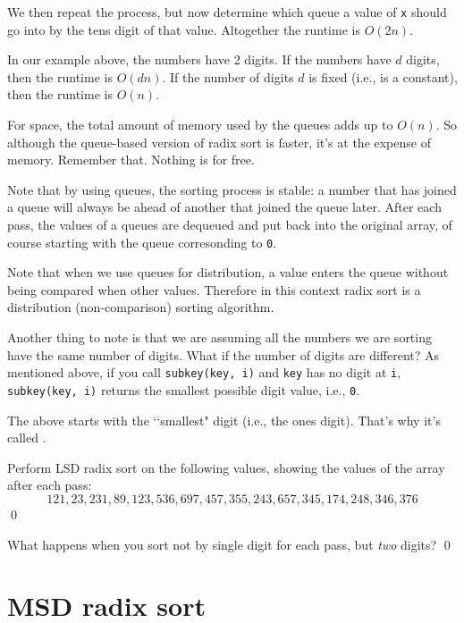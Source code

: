 We then repeat the process, but now determine which queue a value of \verb!x!
should go into by the tens digit of that value.
Altogether the runtime is $O(2n)$.

In our example above, the numbers have 2 digits.
If the numbers have $d$ digits, then the runtime is $O(dn)$.
If the number of digits $d$ is fixed (i.e., is a constant),
then the runtime is $O(n)$.

For space, the total amount of memory used by the queues 
adds up to 
$O(n)$.
So although the queue-based version of radix sort is faster,
it's at the expense of memory.
Remember that.
Nothing is for free.

Note that by using queues, 
the sorting process is stable:
a number that has joined a queue will always be ahead of another
that joined the queue later.
After each pass, the values of a queues are dequeued and put back 
into the original array, of course starting with 
the queue corresonding to \verb!0!.

Note that when we use queues for distribution, a value
enters the queue without being compared when other values.
Therefore in this context radix sort is a distribution (non-comparison) sorting
algorithm.

Another thing to note is that we are assuming all the numbers
we are sorting have the same number of digits.
What if the number of digits are different?
As mentioned above, if you call \verb!subkey(key, i)!
and \verb!key! has no digit at \verb!i!,
\verb!subkey(key, i)! returns the smallest possible digit value, i.e., \verb!0!.

The above starts with the \lq\lq smallest" digit (i.e., the ones digit).
That's why it's called .

\newpage

\begin{ex}
  Perform LSD radix sort on the following values, showing the
  values of the array after each pass:
  \[
    121, 23, 231, 89, 123, 536, 697, 457, 355, 243, 657, 345, 174, 248, 346, 376
  \]
  \qed
\end{ex}

\begin{ex}
What happens when you sort not by single digit for each pass, but
\textit{two} digits?
\qed
\end{ex}



\newpage
\section{MSD radix sort}

